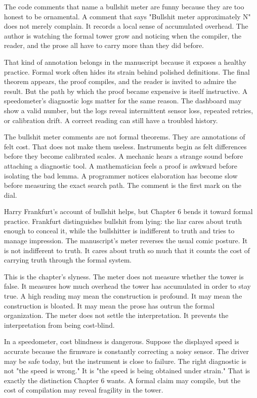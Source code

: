The code comments that name a bullshit meter are funny because they are too
honest to be ornamental. A comment that says "Bullshit meter approximately N"
does not merely complain. It records a local sense of accumulated overhead. The
author is watching the formal tower grow and noticing when the compiler, the
reader, and the prose all have to carry more than they did before.

That kind of annotation belongs in the manuscript because it exposes a healthy
practice. Formal work often hides its strain behind polished definitions. The
final theorem appears, the proof compiles, and the reader is invited to admire
the result. But the path by which the proof became expensive is itself
instructive. A speedometer's diagnostic logs matter for the same reason. The
dashboard may show a valid number, but the logs reveal intermittent sensor
loss, repeated retries, or calibration drift. A correct reading can still have
a troubled history.

The bullshit meter comments are not formal theorems. They are annotations of
felt cost. That does not make them useless. Instruments begin as felt
differences before they become calibrated scales. A mechanic hears a strange
sound before attaching a diagnostic tool. A mathematician feels a proof is
awkward before isolating the bad lemma. A programmer notices elaboration has
become slow before measuring the exact search path. The comment is the first
mark on the dial.

Harry Frankfurt's account of bullshit helps, but Chapter 6 bends it toward
formal practice. Frankfurt distinguishes bullshit from lying: the liar cares
about truth enough to conceal it, while the bullshitter is indifferent to truth
and tries to manage impression. The manuscript's meter reverses the usual
comic posture. It is not indifferent to truth. It cares about truth so much
that it counts the cost of carrying truth through the formal system.

This is the chapter's slyness. The meter does not measure whether the tower is
false. It measures how much overhead the tower has accumulated in order to stay
true. A high reading may mean the construction is profound. It may mean the
construction is bloated. It may mean the prose has outrun the formal
organization. The meter does not settle the interpretation. It prevents the
interpretation from being cost-blind.

In a speedometer, cost blindness is dangerous. Suppose the displayed speed is
accurate because the firmware is constantly correcting a noisy sensor. The
driver may be safe today, but the instrument is close to failure. The right
diagnostic is not "the speed is wrong." It is "the speed is being obtained
under strain." That is exactly the distinction Chapter 6 wants. A formal claim
may compile, but the cost of compilation may reveal fragility in the tower.

